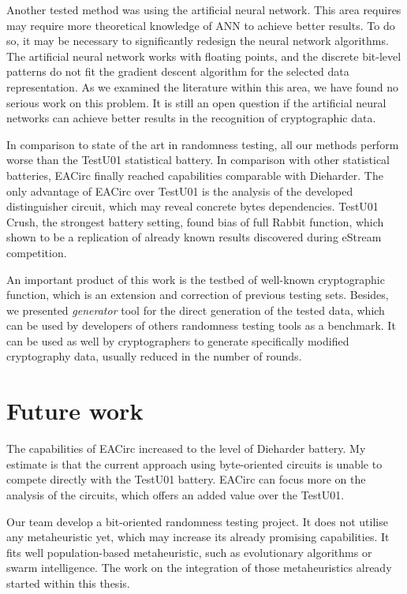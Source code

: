 \documentclass[
    digital,    %
    oneside,    %
    color,
    11pt,
    nocover,
    notable,
    nolof,
    nolot,
]{fithesis3}
\begin{document}
Another tested method was using the artificial neural network. This area requires may require more theoretical knowledge of ANN to achieve better results. To do so, it may be necessary to significantly redesign the neural network algorithms. The artificial neural network works with floating points, and the discrete bit-level patterns do not fit the gradient descent algorithm for the selected data representation. As we examined the literature within this area, we have found no serious work on this problem. It is still an open question if the artificial neural networks can achieve better results in the recognition of cryptographic data.

In comparison to state of the art in randomness testing, all our methods perform worse than the TestU01 statistical battery. In comparison with other statistical batteries, EACirc finally reached capabilities comparable with Dieharder. The only advantage of EACirc over TestU01 is the analysis of the developed distinguisher circuit, which may reveal concrete bytes dependencies. TestU01 Crush, the strongest battery setting, found bias of full Rabbit function, which shown to be a replication of already known results discovered during eStream competition.

An important product of this work is the testbed of well-known cryptographic function, which is an extension and correction of previous testing sets. Besides, we presented \textit{generator} tool for the direct generation of the tested data, which can be used by developers of others randomness testing tools as a benchmark. It can be used as well by cryptographers to generate specifically modified cryptography data, usually reduced in the number of rounds.

\section{Future work}
\label{sec:conclusion-future}

The capabilities of EACirc increased to the level of Dieharder battery. My estimate is that the current approach using byte-oriented circuits is unable to compete directly with the TestU01 battery. EACirc can focus more on the analysis of the circuits, which offers an added value over the TestU01.

Our team develop a bit-oriented randomness testing project. It does not utilise any metaheuristic yet, which may increase its already promising capabilities. It fits well population-based metaheuristic, such as evolutionary algorithms or swarm intelligence. The work on the integration of those metaheuristics already started within this thesis.
\end{document}
